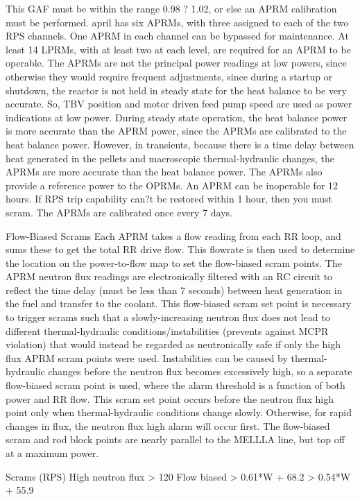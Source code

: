 \documentclass[10pt]{article}
\begin{document}
This GAF must be within the range 0.98 ? 1.02, or else an APRM calibration must be performed. april has six APRMs, with three assigned to each of the two RPS channels. One APRM in each channel can be bypassed for maintenance. At least 14 LPRMs, with at least two at each level, are required for an APRM to be operable. The APRMs are not the principal power readings at low powers, since otherwise they would require frequent adjustments, since during a startup or shutdown, the reactor is not held in steady state for the heat balance to be very accurate. So, TBV position and motor driven feed pump speed are used as power indications at low power. During steady state operation, the heat balance power is more accurate than the APRM power, since the APRMs are calibrated to the heat balance power. However, in transients, because there is a time delay between heat generated in the pellets and macroscopic thermal-hydraulic changes, the APRMs are more accurate than the heat balance power. The APRMs also provide a reference power to the OPRMs. An APRM can be inoperable for 12 hours. If RPS trip capability can?t be restored within 1 hour, then you must scram. The APRMs are calibrated once every 7 days. 

Flow-Biased Scrams
Each APRM takes a flow reading from each RR loop, and sums these to get the total RR drive flow. This flowrate is then used to determine the location on the power-to-flow map to set the flow-biased scram points. The APRM neutron flux readings are electronically filtered with an RC circuit to reflect the time delay (must be less than 7 seconds) between heat generation in the fuel and transfer to the coolant. This flow-biased scram set point is necessary to trigger scrams such that a slowly-increasing neutron flux does not lead to different thermal-hydraulic conditions/instabilities (prevents against MCPR violation) that would instead be regarded as neutronically safe if only the high flux APRM scram points were used. Instabilities can be caused by thermal-hydraulic changes before the neutron flux becomes excessively high, so a separate flow-biased scram point is used, where the alarm threshold is a function of both power and RR flow. This scram set point occurs before the neutron flux high point only when thermal-hydraulic conditions change slowly. Otherwise, for rapid changes in flux, the neutron flux high alarm will occur first. The flow-biased scram and rod block points are nearly parallel to the MELLLA line, but top off at a maximum power. 

Scrams (RPS)
High neutron flux
> 120%
Flow biased
> 0.61*W + 68.2%
> 0.54*W + 55.9%
\end{document}
